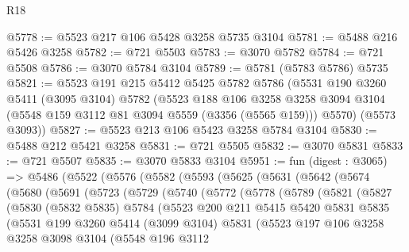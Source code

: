 \begin{lexlean}{R18}
\begin{coremodule}
@5778 := @5523 @217 @106 @5428 @3258 @5735 @3104
@5781 := @5488 @216 @5426 @3258
@5782 := @721 @5503
@5783 := @3070 @5782
@5784 := @721 @5508
@5786 := @3070 @5784 @3104
@5789 := @5781 (@5783 @5786) @5735
@5821 := @5523
    @191
    @215
    @5412
    @5425
    @5782
    @5786
    (@5531
      @190
      @3260
      @5411
      (@3095 @3104)
      @5782
      (@5523
        @188
        @106
        @3258
        @3258
        @3094
        @3104
        (@5548 @159 @3112 @81 @3094 @5559 (@3356 (@5565 @159)))
        @5570)
      (@5573 @3093))
@5827 := @5523 @213 @106 @5423 @3258 @5784 @3104
@5830 := @5488 @212 @5421 @3258
@5831 := @721 @5505
@5832 := @3070 @5831
@5833 := @721 @5507
@5835 := @3070 @5833 @3104
@5951 := fun (digest : @3065) =>
  @5486
    (@5522
      (@5576
        (@5582
          (@5593
            (@5625
              (@5631
                (@5642
                  (@5674
                    (@5680
                      (@5691
                        (@5723
                          (@5729
                            (@5740
                              (@5772
                                (@5778
                                  (@5789
                                    (@5821
                                      (@5827
                                        (@5830
                                          (@5832 @5835)
                                          @5784
                                          (@5523
                                            @200
                                            @211
                                            @5415
                                            @5420
                                            @5831
                                            @5835
                                            (@5531
                                              @199
                                              @3260
                                              @5414
                                              (@3099 @3104)
                                              @5831
                                              (@5523
                                                @197
                                                @106
                                                @3258
                                                @3258
                                                @3098
                                                @3104
                                                (@5548
                                                  @196
                                                  @3112

\end{coremodule}
\end{lexlean}
